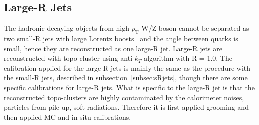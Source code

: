\subsection{Large-R Jets}
The hadronic decaying objects from high-$p_\mathrm{T}$ W/Z boson cannot be separated as two small-R jets with large Lorentz boosts~\cite{JETM-2018-06} and the angle between quarks is small, hence they are reconstructed as one large-R jet.
Large-R jets are reconstructed with topo-cluster using anti-$k_T$ algorithm with R = 1.0. 
The calibration applied for the large-R jets is mainly the same as the procedure with the small-R jets, described in subsection~\ref{subsec:sRjets}, though there are some specific calibrations for large-R jets.
What is specific to the large-R jet is that the reconstructed topo-clusters are highly contaminated by the calorimeter noises, particles from pile-up, soft radiations. Therefore it is first applied grooming and then applied MC and in-situ calibrations. 
